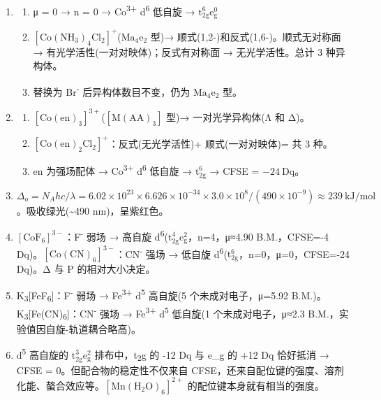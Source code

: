 \begin{enumerate}
\def\labelenumi{\arabic{enumi}.}
\setcounter{enumi}{9}
\item
  \begin{enumerate}
  \def\labelenumii{(\arabic{enumii})}
  \tightlist
  \item
    μ = 0 → n = 0 → Co\textsuperscript{3+} d\textsuperscript{6} 低自旋 → \(\mathrm{t_{2g}^6 e_g^0}\)
  \item
    \(\mathrm{[Co(NH_3)_4Cl_2]^+}\)(\(\mathrm{Ma_4e_2}\) 型)→ 顺式(1,2-)和反式(1,6-)。顺式无对称面 → 有光学活性(一对对映体)；反式有对称面 → 无光学活性。总计 3 种异构体。
  \item
    替换为 Br\textsuperscript{-} 后异构体数目不变，仍为 \(\mathrm{Ma_4e_2}\) 型。
  \end{enumerate}
\item
  \begin{enumerate}
  \def\labelenumii{(\arabic{enumii})}
  \tightlist
  \item
    \([\mathrm{Co(en)_3}]^{3+}\)(\(\mathrm{[M(AA)_3]}\) 型)→ 一对光学异构体(Λ 和 Δ)。
  \item
    \([\mathrm{Co(en)_2Cl_2}]^+\)：反式(无光学活性)+ 顺式(一对对映体)= 共 3 种。
  \item
    en 为强场配体 → Co\textsuperscript{3+} d\textsuperscript{6} 低自旋 → \(\mathrm{t_{2g}^6}\) → CFSE = \(-24\ \mathrm{Dq}\)。
  \end{enumerate}
\item
  \(\Delta_o = N_A hc/\lambda = 6.02\times10^{23} \times 6.626\times10^{-34} \times 3.0\times10^8 / (490\times10^{-9}) \approx 239\ \mathrm{kJ/mol}\)。吸收绿光(\textasciitilde490 nm)，呈紫红色。
\item
  \([\mathrm{CoF_6}]^{3-}\)：F\textsuperscript{-} 弱场 → 高自旋 d\textsuperscript{6}(\(\mathrm{t_{2g}^4 e_g^2}\)，n=4，μ≈4.90 B.M.，CFSE=-4 Dq)。\([\mathrm{Co(CN)_6}]^{3-}\)：CN\textsuperscript{-} 强场 → 低自旋 d\textsuperscript{6}(\(\mathrm{t_{2g}^6}\)，n=0，μ=0，CFSE=-24 Dq)。Δ 与 P 的相对大小决定。
\item
  K\textsubscript{3}{[}FeF\textsubscript{6}{]}：F\textsuperscript{-} 弱场 → Fe\textsuperscript{3+} d\textsuperscript{5} 高自旋(5 个未成对电子，μ=5.92 B.M.)。K\textsubscript{3}{[}Fe(CN)\textsubscript{6}{]}：CN\textsuperscript{-} 强场 → Fe\textsuperscript{3+} d\textsuperscript{5} 低自旋(1 个未成对电子，μ≈2.3 B.M.，实验值因自旋-轨道耦合略高)。
\item
  d\textsuperscript{5} 高自旋的 \(\mathrm{t_{2g}^3 e_g^2}\) 排布中，t\textsubscript{2}g 的 -12 Dq 与 e\_g 的 +12 Dq 恰好抵消 → CFSE = 0。但配合物的稳定性不仅来自 CFSE，还来自配位键的强度、溶剂化能、螯合效应等。\([\mathrm{Mn(H_2O)_6}]^{2+}\) 的配位键本身就有相当的强度。
\end{enumerate}

